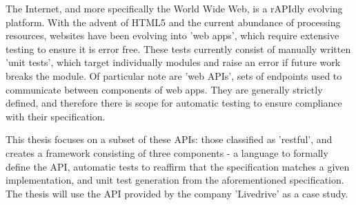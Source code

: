The Internet, and more specifically the World Wide Web, is a rAPIdly evolving platform. With the advent of HTML5 and the current abundance of processing resources, websites have been evolving into 'web apps', which require extensive testing to ensure it is error free. These tests currently consist of manually written 'unit tests', which target individually modules and raise an error if future work breaks the module. Of particular note are 'web APIs', sets of endpoints used to communicate between components of web apps. They are generally strictly defined, and therefore there is scope for automatic testing to ensure compliance with their specification.

This thesis focuses on a subset of these APIs: those classified as 'restful', and creates a framework consisting of three components - a language to formally define the API, automatic tests to reaffirm that the specification matches a given implementation, and unit test generation from the aforementioned specification. The thesis will use the API provided by the company 'Livedrive' as a case study.
